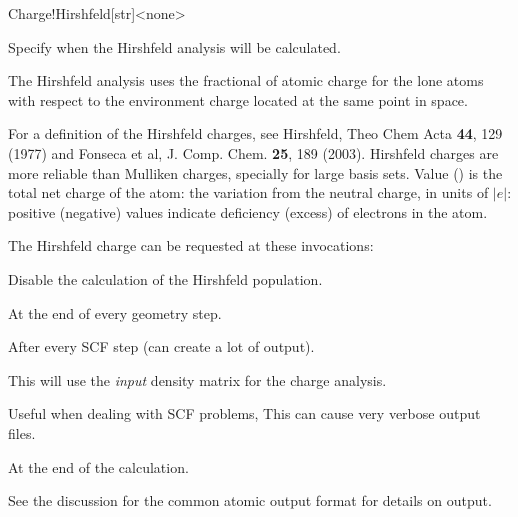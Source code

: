 \begin{fdfentry}{Charge!Hirshfeld}[str]<none>
  
  Specify when the Hirshfeld analysis will be calculated.

  The Hirshfeld analysis uses the fractional of atomic charge
  for the lone atoms with respect to the environment charge located
  at the same point in space.
 
  For a definition of
  the Hirshfeld charges, see Hirshfeld, Theo Chem Acta \textbf{44},
  129 (1977) and Fonseca et al, J. Comp. Chem. \textbf{25}, 189
  (2003). Hirshfeld charges are more reliable than Mulliken charges,
  specially for large basis sets. Value () is the total net
  charge of the atom: the variation from the neutral charge, in units
  of $|e|$: positive (negative) values indicate deficiency (excess) of
  electrons in the atom.

  The Hirshfeld charge can be requested at these invocations:

  \begin{fdfoptions}
    \option[none]%
    Disable the calculation of the Hirshfeld population.

    \option[geometry]%
    At the end of every geometry step.

    \option[scf]%
    After every SCF step (can create a lot of output).

    This will use the \emph{input} density matrix for the charge analysis.

    Useful when dealing with SCF problems,
    This can cause very verbose output files.
    
    \option[end]%
    At the end of the calculation.

  \end{fdfoptions}

  See the discussion for the common atomic output format for details on output. 

\end{fdfentry}



